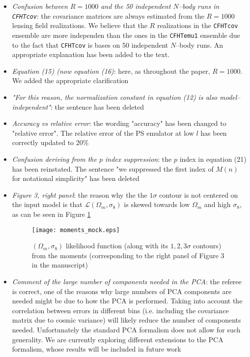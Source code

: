 \documentclass[11pt]{article}
\begin{document}
\begin{itemize}
\item \textit{Confusion between $R=1000$ and the 50 independent $N$--body runs in \texttt{CFHTcov}}: the covariance matrices are always estimated from the $R=1000$ lensing field realizations. We believe that the $R$ realizations in the \texttt{CFHTcov} ensemble are more independen than the ones in the \texttt{CFHTemu1} ensemble due to the fact that \texttt{CFHTcov} is bases on 50 independent $N$--body runs. An appropriate explanation has been added to the text. 
\item \textit{Equation (15) (now equation (16)}: here, as throughout the paper, $R=1000$. We added the appropriate clarification
\item \textit{"For this reason, the normalization constant in equation (12) is also model–independent"}: the sentence has been deleted
\item \textit{Accuracy vs relative error}: the wording "accuracy" has been changed to "relative error". The relative error of the PS emulator at low $l$ has been correctly updated to 20\%
\item \textit{Confusion deriving from the $p$ index suppression}: the $p$ index in equation (21) has been reinstated. The sentence "we suppressed the first index of $M(n)$ for notational simplicity" has been deleted  
\item \textit{Figure 3, right panel}: the reason why the the $1\sigma$ contour is not centered on the input model is that $\mathcal{L}(\Omega_m,\sigma_8)$ is skewed towards low $\Omega_m$ and high $\sigma_8$, as can be seen in Figure \ref{mock}
%
\begin{figure}
\begin{center}
\texttt{[image: moments\_mock.eps]}
\end{center}
\caption{$(\Omega_m,\sigma_8)$ likelihood function (along with its $1,2,3\sigma$ contours) from the moments (corresponding to the right panel of Figure 3 in the manuscript)}
\label{mock}
\end{figure}
%
\item \textit{Comment of the large number of components needed in the PCA}: the referee is correct, one of the reasons why large numbers of PCA components are needed might be due to how the PCA is performed. Taking into account the correlation between errors in different bins (i.e. including the covariance matrix due to cosmic variance) will likely reduce the number of components needed. Unfortunately the standard PCA formalism does not allow for such generality. We are currently exploring different extensions to the PCA formalism, whose results will be included in future work

\end{itemize}
\end{document}
